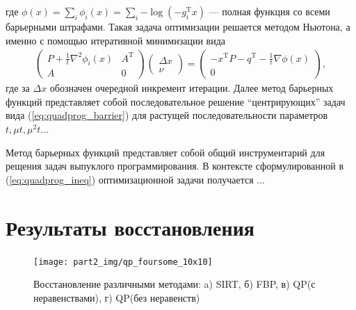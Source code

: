 где $\phi(x) = \sum_i \phi_i (x) = \sum_i {-\log{\left(- g_i^\mathrm{T}x \right)}}$ --- полная функция со всеми барьерными штрафами. 
Такая задача оптимизации решается методом Ньютона, а именно с помощью итеративной минимизации вида
\begin{gather}
\left(
  \begin{matrix}
  P + \frac 1 t \nabla^2 \phi_i(x) & A ^\mathrm{T} \\
  A & 0
  \end{matrix}
  \right)
  \left(
  \begin{matrix}
  \Delta x \\ \nu
  \end{matrix}
  \right)
  =
  \left(
  \begin{matrix}
  -x^\mathrm{T}P - q^\mathrm{T} - \frac 1 t \nabla \phi(x) \\ 0
  \end{matrix}
  \right),
\end{gather}
где за $\Delta x$ обозначен очередной инкремент итерации.
Далее метод барьерных функций представляет собой последовательное решение ``центрирующих'' задач вида (\ref{eq:quadprog_barrier}) для растущей последовательности параметров $t, \mu t, \mu^2 t \dots$

Метод барьерных функций представляет собой общий инструментарий для рещения задач выпуклого программирования. 
В контексте сформулированной в (\ref{eq:quadprog_ineq}) оптимизационной задачи получается ... 


\section{Результаты восстановления}
 \label{sect_2_resutls_qp_10x10}

\begin{figure}
  \centering
  \texttt{[image: part2\_img/qp\_foursome\_10x10]}
  \caption{Восстановление различными методами: a) SIRT, б) FBP, в) QP(с неравенствами), г) QP(без неравенств)}
  \label{im:quadprog}
\end{figure}

